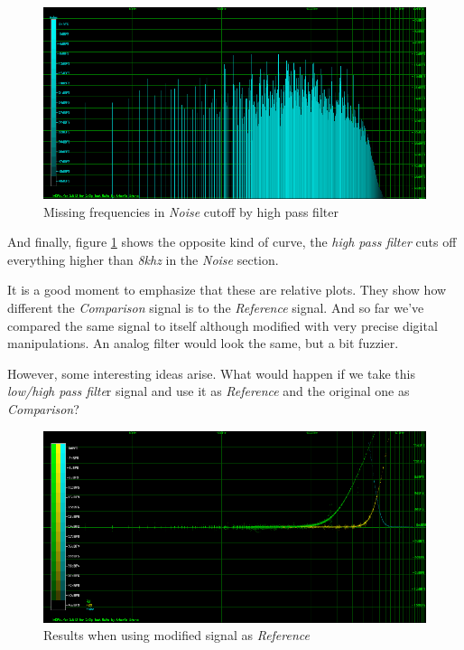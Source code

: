 \documentclass[10pt,a4paper]{report}
\begin{document}
\begin{figure}[H]
	\centering
	\includegraphics[width=1.0\linewidth]{plots/Plot4-6-Missing-Noise.png}
	\caption[Missing Noise]{Missing frequencies in \textit{Noise} cutoff by high pass filter}
	\label{fig:plot4-6-missing-noise}
\end{figure}

And finally, figure \ref{fig:plot4-6-missing-noise} shows the opposite kind of curve, the \textit{high pass filter} cuts off everything higher than \textit{8khz} in the \textit{Noise} section.

It is a good moment to emphasize that these are relative plots. They show how different the \textit{Comparison} signal is to the \textit{Reference} signal. And so far we've compared the same signal to itself although modified with very precise digital manipulations. An analog filter would look the same, but a bit fuzzier. 

However, some interesting ideas arise. What would happen if we take this \textit{low/high pass filte}r signal and use it as \textit{Reference} and the original one as \textit{Comparison}?

\begin{figure}[H]
	\centering
	\includegraphics[width=1.0\linewidth]{plots/Plot4-7-Reversed.png}
	\caption[Reversed]{Results when using modified signal as \textit{Reference}}
	\label{fig:plot4-7-reversed}
\end{figure}
\end{document}
